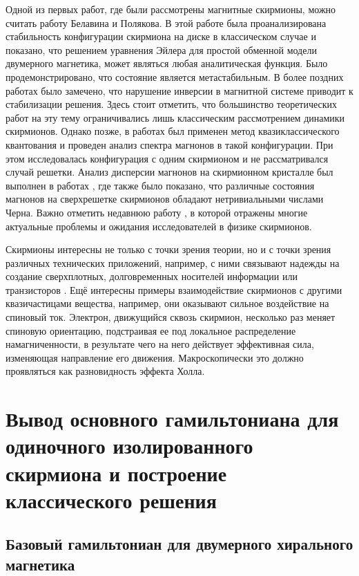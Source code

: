 \documentclass[a4paper,article,14pt]{extarticle}
\begin{document}
Одной из первых работ, где были рассмотрены магнитные скирмионы, можно считать работу Белавина и Полякова. \cite{belavin} В этой работе была проанализирована стабильность конфигурации скирмиона на диске в классическом случае и показано, что решением уравнения Эйлера для простой обменной модели двумерного магнетика, может являться любая аналитическая функция. Было продемонстрировано, что состояние является метастабильным. В более поздних работах было замечено, что нарушение инверсии в магнитной системе приводит к стабилизации решения.\cite{bogdanov} Здесь стоит отметить, что большинство теоретических работ на эту тему ограничивались лишь классическим рассмотрением динамики скирмионов.\cite{kiselevBogdanov} Однако позже, в работах  \cite{aristov1, garst} был применен метод квазиклассического квантования и проведен анализ спектра магнонов в такой конфигурации. При этом исследовалась конфигурация с одним скирмионом и не рассматривался случай решетки. Анализ дисперсии магнонов на скирмионном кристалле был выполнен в работах \cite{garst_2017, roldan}, где также было показано, что различные состояния магнонов на сверхрешетке скирмионов обладают нетривиальными числами Черна. Важно отметить недавнюю работу \cite{back}, в которой отражены многие актуальные проблемы и ожидания исследователей в физике скирмионов.

Скирмионы интересны не только с точки зрения теории, но и с точки зрения различных технических приложений, например, с ними связывают надежды на создание сверхплотных, долговременных носителей информации \cite{fert} или транзисторов \cite{zhang}. Ещё интересны примеры взаимодействие скирмионов с другими квазичастицами вещества, например, они оказывают сильное воздействие на спиновый ток. Электрон, движущийся сквозь скирмион, несколько раз меняет спиновую ориентацию, подстраивая ее под локальное распределение намагниченности, в результате чего на него действует эффективная сила, изменяющая направление его движения. Макроскопически это должно проявляться как разновидность эффекта Холла.\cite{rosch_pfleiderer}


\pagebreak
\section{Вывод основного гамильтониана для одиночного изолированного скирмиона и построение классического решения}
\subsection{Базовый гамильтониан для двумерного хирального магнетика}
\end{document}

